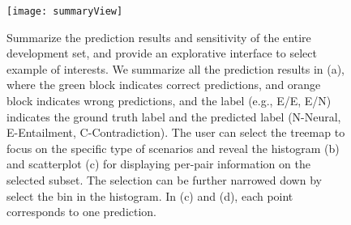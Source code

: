 \begin{figure}[htbp]
\centering
\vspace{-2mm}
 \texttt{[image: summaryView]}
 \caption{
Summarize the prediction results and sensitivity of the entire development set, and provide an explorative interface to select example of interests.
We summarize all the prediction results in (a), where the green block indicates correct predictions, and orange block indicates wrong predictions, and the label (e.g., E/E, E/N) indicates the ground truth label and the predicted label (N-Neural, E-Entailment, C-Contradiction).
%
The user can select the treemap to focus on the specific type of scenarios and reveal the histogram (b) and scatterplot (c) for displaying per-pair information on the selected subset.
The selection can be further narrowed down by select the bin in the histogram.
In (c) and (d), each point corresponds to one prediction.
 }
\label{fig:summaryView}
\end{figure}

